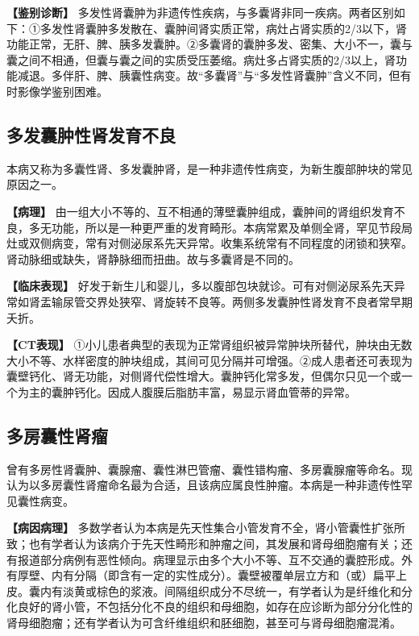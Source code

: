 \textbf{【鉴别诊断】}
多发性肾囊肿为非遗传性疾病，与多囊肾非同一疾病。两者区别如下：①多发性肾囊肿多发散在、囊肿间肾实质正常，病灶占肾实质的2/3以下，肾功能正常，无肝、脾、胰多发囊肿。②多囊肾的囊肿多发、密集、大小不一，囊与囊之间不相通，但囊与囊之间的实质受压萎缩。病灶多占肾实质的2/3以上，肾功能减退。多伴肝、脾、胰囊性病变。故“多囊肾”与“多发性肾囊肿”含义不同，但有时影像学鉴别困难。

\subsection{多发囊肿性肾发育不良}

本病又称为多囊性肾、多发囊肿肾，是一种非遗传性病变，为新生腹部肿块的常见原因之一。

\textbf{【病理】}
由一组大小不等的、互不相通的薄壁囊肿组成，囊肿间的肾组织发育不良，多无功能，所以是一种更严重的发育畸形。本病常累及单侧全肾，罕见节段局灶或双侧病变，常有对侧泌尿系先天异常。收集系统常有不同程度的闭锁和狭窄。肾动脉细或缺失，肾静脉细而扭曲。故与多囊肾是不同的。

\textbf{【临床表现】}
好发于新生儿和婴儿，多以腹部包块就诊。可有对侧泌尿系先天异常如肾盂输尿管交界处狭窄、肾旋转不良等。两侧多发囊肿性肾发育不良者常早期夭折。

\textbf{【CT表现】}
①小儿患者典型的表现为正常肾组织被异常肿块所替代，肿块由无数大小不等、水样密度的肿块组成，其间可见分隔并可增强。②成人患者还可表现为囊壁钙化、肾无功能，对侧肾代偿性增大。囊肿钙化常多发，但偶尔只见一个或一个为主的囊肿钙化。因成人腹膜后脂肪丰富，易显示肾血管蒂的异常。

\subsection{多房囊性肾瘤}

曾有多房性肾囊肿、囊腺瘤、囊性淋巴管瘤、囊性错构瘤、多房囊腺瘤等命名。现认为以多房囊性肾瘤命名最为合适，且该病应属良性肿瘤。本病是一种非遗传性罕见囊性病变。

\textbf{【病因病理】}
多数学者认为本病是先天性集合小管发育不全，肾小管囊性扩张所致；也有学者认为该病介于先天性畸形和肿瘤之间，其发展和肾母细胞瘤有关；还有报道部分病例有恶性倾向。病理显示由多个大小不等、互不交通的囊腔形成。外有厚壁、内有分隔（即含有一定的实性成分）。囊壁被覆单层立方和（或）扁平上皮。囊内有淡黄或棕色的浆液。间隔组织成分不尽统一，有学者认为是纤维化和分化良好的肾小管，不包括分化不良的组织和母细胞，如存在应诊断为部分分化性的肾母细胞瘤；还有学者认为可含纤维组织和胚细胞，甚至可与肾母细胞瘤混淆。


